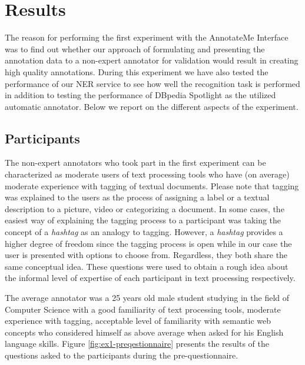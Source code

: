 \section{Results}
\label{framework:results}
The reason for performing the first experiment with the AnnotateMe Interface was to find out whether our approach of formulating and presenting the annotation data to a non-expert annotator for validation would result in creating high quality annotations. During this experiment we have also tested the performance of our NER service to see how well the recognition task is performed in addition to testing the performance of DBpedia Spotlight as the utilized automatic annotator. Below we report on the different aspects of the experiment.

\subsection{Participants}
The non-expert annotators who took part in the first experiment can be characterized as moderate users of text processing tools who have (on average) moderate experience with tagging of textual documents. Please note that tagging was explained to the users as the process of assigning a label or a textual description to a picture, video or categorizing a document. In some cases, the easiest way of explaining the tagging process to a participant was taking the concept of a \textit{hashtag} as an analogy to tagging. However, a \textit{hashtag} provides a higher degree of freedom since the tagging process is open while in our case the user is presented with options to choose from. Regardless, they both share the same conceptual idea. These questions were used to obtain a rough idea about the informal level of expertise of each participant in text processing respectively.

The average annotator was a 25 years old male student studying in the field of Computer Science with a good familiarity of text processing tools, moderate experience with tagging, acceptable level of familiarity with semantic web concepts who considered himself as above average when asked for his English language skills. Figure \ref{fig:ex1-preqestionnaire} presents the results of the questions asked to the participants during the pre-questionnaire. 

